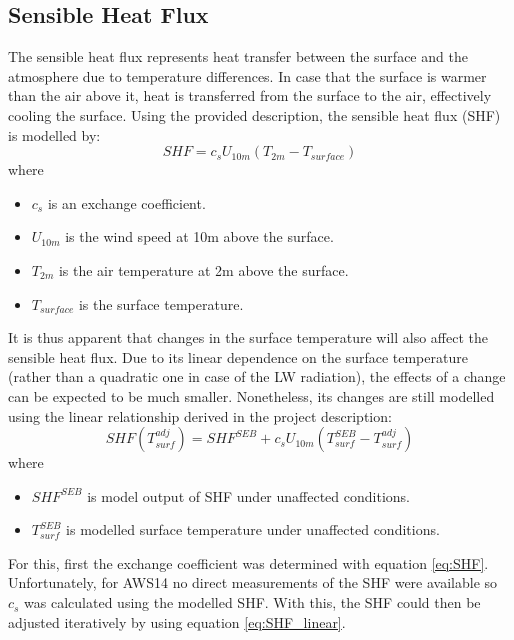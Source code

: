 \documentclass{article}
\begin{document}
\subsection*{Sensible Heat Flux}
The sensible heat flux represents heat transfer between the surface and the atmosphere due to temperature differences. 
In case that the surface is warmer than the air above it, heat is transferred from the surface to the air, effectively cooling the surface. 
Using the provided description, the sensible heat flux (SHF) is modelled by:
\begin{equation}\label{eq:SHF}
  SHF = c_s U_{10m} (T_{2m} - T_{surface})
\end{equation}
where \vspace{-0.5\baselineskip}
\begin{itemize}[noitemsep]
  \item $c_s$ is an exchange coefficient.
  \item $U_{10m}$ is the wind speed at 10m above the surface.
  \item $T_{2m}$ is the air temperature at 2m above the surface.
  \item $T_{surface}$ is the surface temperature.
\end{itemize}
It is thus apparent that changes in the surface temperature will also affect the sensible heat flux. 
Due to its linear dependence on the surface temperature (rather than a quadratic one in case of the LW radiation), the effects of a change can be expected to be much smaller. 
Nonetheless, its changes are still modelled using the linear relationship derived in the project description:
\begin{equation}\label{eq:SHF_linear}
  SHF(T_{surf}^{adj}) = SHF^{SEB} + c_s U_{10m} (T_{surf}^{SEB} - T_{surf}^{adj})
\end{equation}
where \vspace{-0.5\baselineskip}
\begin{itemize}[noitemsep]
  \item $SHF^{SEB}$ is model output of SHF under unaffected conditions.
  \item $T_{surf}^{SEB}$ is modelled surface temperature under unaffected conditions.
\end{itemize}
For this, first the exchange coefficient was determined with equation \eqref{eq:SHF}. 
Unfortunately, for AWS14 no direct measurements of the SHF were available so $c_s$ was calculated using the modelled SHF. 
With this, the SHF could then be adjusted iteratively by using equation \eqref{eq:SHF_linear}.
\end{document}

